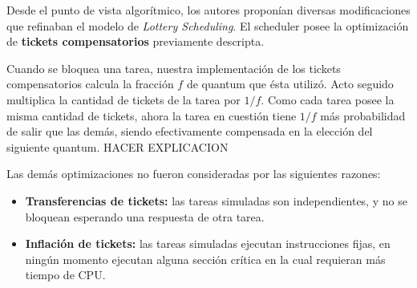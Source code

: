 Desde el punto de vista algor\'itmico, los autores propon\'ian diversas modificaciones que refinaban el modelo de \textit{Lottery Scheduling}. El scheduler posee la optimizaci\'on de \textbf{tickets compensatorios} previamente descripta.

\vspace{2mm}

Cuando se bloquea una tarea, nuestra implementaci\'on de los tickets compensatorios calcula la fracci\'on $f$ de quantum que \'esta utiliz\'o. Acto seguido multiplica la cantidad de tickets de la tarea por $1/f$. Como cada tarea posee la misma cantidad de tickets, ahora la tarea en cuesti\'on tiene $1/f$ m\'as probabilidad de salir que las dem\'as, siendo efectivamente compensada en la elecci\'on del siguiente quantum. HACER EXPLICACION

Las dem\'as optimizaciones no fueron consideradas por las siguientes razones:

\begin{itemize}

\item \textbf{Transferencias de tickets:} las tareas simuladas son independientes, y no se bloquean esperando una respuesta de otra tarea.

\item \textbf{Inflaci\'on de tickets:} las tareas simuladas ejecutan instrucciones fijas, en ning\'un momento ejecutan alguna secci\'on cr\'itica en la cual requieran m\'as tiempo de CPU. 

\end{itemize}

